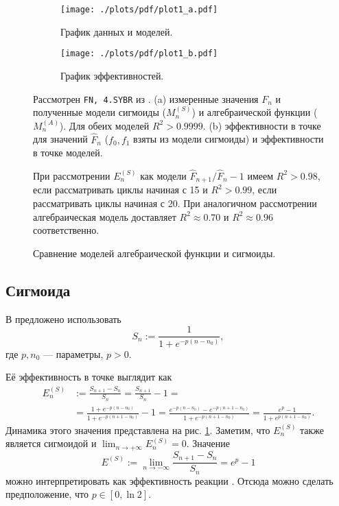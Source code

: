 \begin{figure}
  {\centering

    \begin{subfigure}{\textwidth}
      \centering
      \texttt{[image: ./plots/pdf/plot1\_a.pdf]}
      \caption{График данных и моделей.}
    \end{subfigure}

    \begin{subfigure}{\textwidth}
      \centering
      \texttt{[image: ./plots/pdf/plot1\_b.pdf]}
      \caption{График эффективностей.}
    \end{subfigure}

    \caption{Сравнение моделей алгебраической функции и сигмоиды.}
    \label{fig:model_comparison}

  }

  Рассмотрен {\tt FN, 4.SYBR} из
  \cite{karlenStatisticalSignificanceQuantitative2007}. (a) измеренные
  значения $F_{n}$ и полученные модели сигмоиды ($M_{n}^{(S)}$) и
  алгебраической функции ($M_{n}^{(A)}$). Для обеих моделей $R^{2}>0.9999$.
  (b) эффективности в точке для значений $\hat{F}_{n}$ ($f_0,f_1$ взяты из
  модели сигмоиды) и эффективности в точке моделей.

  При рассмотрении $E^{(S)}_{n}$ как модели $\hat F_{n+1}/\hat F_{n}-1$ имеем
  $R^{2}>0.98$, если рассматривать циклы начиная с 15 и $R^{2}>0.99$, если
  рассматривать циклы начиная с 20. При аналогичном рассмотрении
  алгебраическая модель доставляет $R^{2}\approx 0.70$ и $R^{2}\approx 0.96$
  соответственно.
\end{figure}

\subsection{Сигмоида}

В \cite{liuValidationQuantitativeMethod2002,
  rutledgeSigmoidalCurvefittingRedefines2004,
  liuProgressCurveAnalysis2011} предложено использовать
\[
  S_{n}:=\frac{1}{1+e^{-p(n-n_0)}},
\]
где $p,n_0$ --- параметры, $p> 0$.

Её эффективность в точке выглядит как
\[
  \begin{aligned}
    E^{(S)}_{n}
     & :=\frac{S_{n+1}-S_{n}}{S_{n}}=\frac{S_{n+1}}{S_{n}}-1= \\
     & =\frac{1+e^{-p(n-n_0)}}{1+e^{-p(n+1-n_0)}}-1=
    \frac{e^{-p(n-n_0)}-e^{-p(n+1-n_0)}}{1+e^{-p(n+1-n_0)}}=
    \frac{e^{p}-1}{1+e^{p(n+1-n_0)}}.
  \end{aligned}
\]
Динамика этого значения представлена на рис. \ref{fig:model_comparison}.
Заметим, что $E^{(S)}_{n}$ также является сигмоидой и
$\lim_{n\to+\infty}E^{(S)}_{n}=0$. Значение
\[
  E^{(S)}:=\lim_{n\to-\infty}\frac{S_{n+1}-S_{n}}{S_{n}}=e^{p}-1
\]
можно интерпретировать как эффективность реакции
\cite{swillensRevisitingSigmoidalCurve2008}. Отсюда можно сделать
предположение, что $p\in [0,\ln 2]$.

